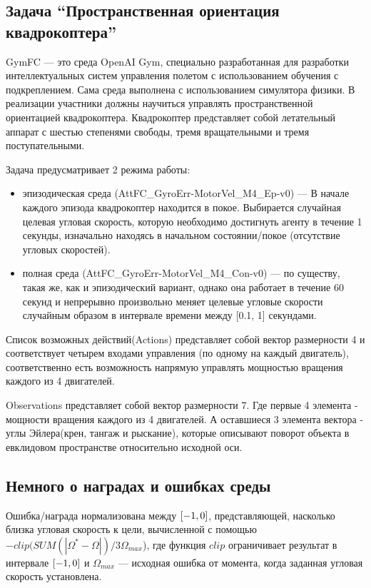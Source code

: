 \subsection*{Задача “Пространственная ориентация квадрокоптера”}

GymFC — это среда OpenAI Gym, специально разработанная для разработки интеллектуальных систем управления полетом с использованием обучения с подкреплением. Сама среда выполнена с использованием симулятора физики. В реализации участники должны научиться управлять пространственной ориентацией квадрокоптера. Квадрокоптер представляет собой летательный аппарат с шестью степенями свободы, тремя вращательными и тремя поступательными. 

Задача предусматривает 2 режима работы: 

\begin{itemize}
    \item эпизодическая среда (AttFC\_GyroErr-MotorVel\_M4\_Ep-v0) — В начале каждого эпизода квадрокоптер находится в покое. Выбирается случайная целевая угловая скорость, которую необходимо достигнуть агенту в течение 1 секунды, изначально находясь в начальном состоянии/покое (отсутствие угловых скоростей).
    \item полная среда (AttFC\_GyroErr-MotorVel\_M4\_Con-v0) — по существу, такая же, как и эпизодический вариант, однако она работает в течение 60 секунд и непрерывно произвольно меняет целевые угловые скорости случайным образом в интервале времени между  [0.1, 1] секундами.
\end{itemize}

Список возможных действий(Actions) представляет собой вектор размерности 4 и соответствует четырем входами управления (по одному на каждый двигатель), соответственно есть возможность напрямую управлять мощностью вращения каждого из 4 двигателей.

Observations представляет собой вектор размерности 7. Где первые 4 элемента - мощности вращения каждого из 4 двигателей. А оставшиеся 3 элемента вектора - углы Эйлера(крен, тангаж и рыскание), которые описывают поворот объекта в евклидовом пространстве относительно исходной оси.


\subsection*{Немного о наградах и ошибках среды}

Ошибка/награда нормализована между $[-1,\space 0]$, представляющей, насколько близка угловая скорость к цели, вычисленной с помощью $-clip (SUM (| \Omega^* - \Omega |) / 3\Omega_{max}$), где функция $clip$ ограничивает результат в интервале $[-1,\space 0]$ и $\Omega_{max}$ — исходная ошибка от момента, когда заданная угловая скорость установлена.

